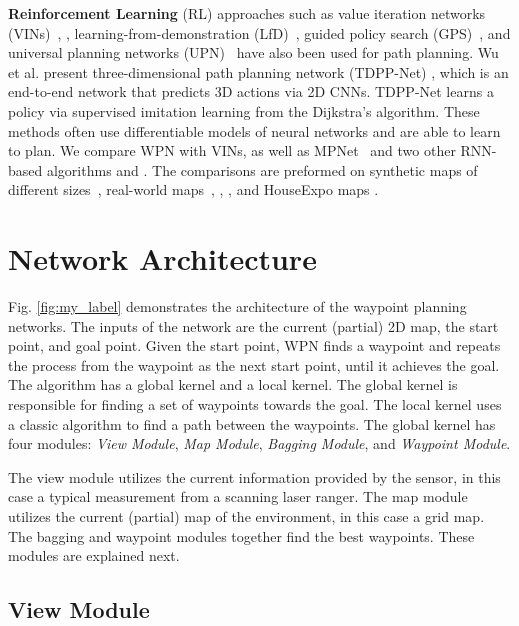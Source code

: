 \documentclass[journal, twocolumn]{IEEEtran}
\begin{document}
\textbf{Reinforcement Learning} (RL) approaches such as value iteration networks (VINs)~\cite{tamar2016value},  \cite{Levine2013},  learning-from-demonstration (LfD)~\cite{Abbeel2010}, guided policy search (GPS)~\cite{Levine2013}, and universal planning networks (UPN)~\cite{srinivas2018universal} have also been used for path planning. Wu et al. present three-dimensional path planning network (TDPP-Net) \cite{TDPPNet}, which is an end-to-end network that predicts 3D actions via 2D CNNs. TDPP-Net learns a policy via supervised imitation learning from the Dijkstra’s algorithm. These methods often use differentiable models of neural networks and are able to learn to plan. We compare WPN with VINs, as well as MPNet~\cite{qureshi2019motion} and two other RNN-based algorithms \cite{nicola2018lstm} and \cite{inoue2019robot}. The comparisons are preformed on synthetic maps of different sizes~\cite{pathbench}, real-world maps~\cite{first_map}, \cite{second_map}, \cite{third_map}, and HouseExpo maps \cite{houseexpo}.



\section{Network Architecture} \label{sec:wpn} 

Fig. \ref{fig:my_label} demonstrates the architecture of the waypoint planning networks. The inputs of the network are the current (partial) 2D map, the start point, and goal point. Given the start point, WPN finds a waypoint and repeats the process from the waypoint as the next start point, until it achieves the goal. The algorithm has a global kernel and a local kernel. The global kernel is responsible for finding a set of waypoints towards the goal. The local kernel uses a classic algorithm to find a path between the waypoints. The global kernel has four modules: 
\emph{View Module},
\emph{Map Module}, 
\emph{Bagging Module}, and
\emph{Waypoint Module}. 

The view module utilizes the current information provided by the sensor, in this case a typical measurement from a scanning laser ranger. The map module utilizes the current (partial) map of the environment, in this case a grid map. The bagging and waypoint modules together find the best waypoints. These modules are explained next. 

\subsection{View Module} \label{sec:view_module}
\end{document}

